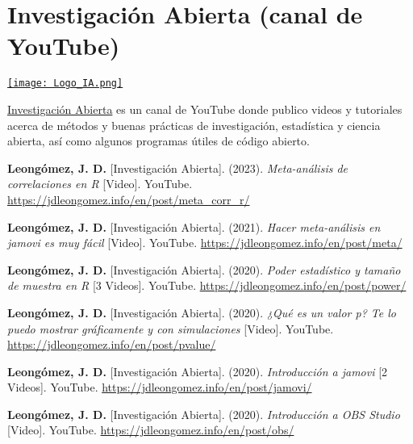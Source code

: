 \documentclass[11pt,a4paper,]{awesome-cv}
\begin{document}
\endgroup

\hypertarget{investigaciuxf3n-abierta-canal-de-youtube}{%
\section{Investigación Abierta (canal de
YouTube)}\label{investigaciuxf3n-abierta-canal-de-youtube}}

\begin{minipage}[c]{0.15\linewidth}
\href{https://www.youtube.com/@InvestigacionAbierta}{\texttt{[image: Logo\_IA.png]}}
\end{minipage} \begin{minipage}[c]{0.85\linewidth}
\textcolor{red}{\faYoutube} \href{https://www.youtube.com/@InvestigacionAbierta}{Investigación Abierta} es un canal de YouTube donde publico videos y tutoriales acerca de métodos y buenas prácticas de investigación, estadística y ciencia abierta, así como algunos programas útiles de código abierto.
\end{minipage}

\begingroup
\footnotesize
\setlength{\parindent}{-0.5in}
\setlength{\leftskip}{0.5in}

\textbf{Leongómez, J. D.} {[}Investigación Abierta{]}. (2023).
\emph{Meta-análisis de correlaciones en R} {[}Video{]}. YouTube.
\url{https://jdleongomez.info/en/post/meta_corr_r/}

\textbf{Leongómez, J. D.} {[}Investigación Abierta{]}. (2021).
\emph{Hacer meta-análisis en jamovi es muy fácil} {[}Video{]}. YouTube.
\url{https://jdleongomez.info/en/post/meta/}

\textbf{Leongómez, J. D.} {[}Investigación Abierta{]}. (2020).
\emph{Poder estadístico y tamaño de muestra en R} {[}3 Videos{]}.
YouTube. \url{https://jdleongomez.info/en/post/power/}

\textbf{Leongómez, J. D.} {[}Investigación Abierta{]}. (2020).
\emph{¿Qué es un valor p? Te lo puedo mostrar gráficamente y con
simulaciones} {[}Video{]}. YouTube.
\url{https://jdleongomez.info/en/post/pvalue/}

\textbf{Leongómez, J. D.} {[}Investigación Abierta{]}. (2020).
\emph{Introducción a jamovi} {[}2 Videos{]}. YouTube.
\url{https://jdleongomez.info/en/post/jamovi/}

\textbf{Leongómez, J. D.} {[}Investigación Abierta{]}. (2020).
\emph{Introducción a OBS Studio} {[}Video{]}. YouTube.
\url{https://jdleongomez.info/en/post/obs/}

\endgroup
\end{document}
